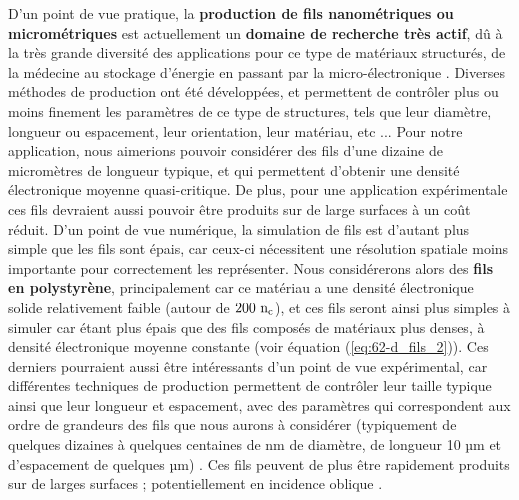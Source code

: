 \begin{refsection}
D'un point de vue pratique, la \textbf{production de fils nanométriques ou micrométriques} est actuellement un \textbf{domaine de recherche très actif}, dû à la très grande diversité des applications pour ce type de matériaux structurés, de la médecine au stockage d'énergie en passant par la micro-électronique \parencite{kuchibhatla_2007}. Diverses méthodes de production ont été développées, et permettent de contrôler plus ou moins finement les paramètres de ce type de structures, tels que leur diamètre, longueur ou espacement, leur orientation, leur matériau, etc \parencite{kuchibhatla_2007} ...
Pour notre application, nous aimerions pouvoir considérer des fils d'une dizaine de micromètres de longueur typique, et qui permettent d'obtenir une densité électronique moyenne quasi-critique. De plus, pour une application expérimentale ces fils devraient aussi pouvoir être produits sur de large surfaces à un coût réduit. D'un point de vue numérique, la simulation de fils est d'autant plus simple que les fils sont épais, car ceux-ci nécessitent une résolution spatiale moins importante pour correctement les représenter. Nous considérerons alors des \textbf{fils en polystyrène}, principalement car ce matériau a une densité électronique solide relativement faible (autour de $200 ~ \rm n_c$), et ces fils seront ainsi plus simples à simuler car étant plus épais que des fils composés de matériaux plus denses, à densité électronique moyenne constante (voir équation (\ref{eq:62-d_fils_2})). Ces derniers pourraient aussi être intéressants d'un point de vue expérimental, car différentes techniques de production permettent de contrôler leur taille typique ainsi que leur longueur et espacement, avec des paramètres qui correspondent aux ordre de grandeurs des fils que nous aurons à considérer (typiquement de quelques dizaines à quelques centaines de nm de diamètre, de longueur 10 µm et d'espacement de quelques µm) \parencite{du_2017, fang_2009}. Ces fils peuvent de plus être rapidement produits sur de larges surfaces \parencite{fang_2009} ; potentiellement en incidence oblique \parencite{zhang_2015}.


\end{refsection}
